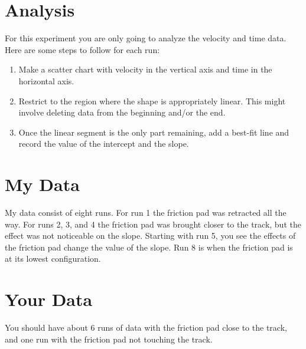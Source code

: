 \section{Analysis}
%
For this experiment you are only going to analyze the velocity and time data. Here are some steps to follow for each run:
\begin{enumerate}
    \item Make a scatter chart with velocity in the vertical axis and time in the horizontal axis.
    \item Restrict to the region where the shape is appropriately linear. This might involve deleting data from the beginning and/or the end.
    \item Once the linear segment is the only part remaining, add a best-fit line and record the value of the intercept and the slope.
\end{enumerate}
%
\section{My Data}
%
My data consist of eight runs. For run 1 the friction pad was retracted all the way. For runs 2, 3, and 4 the friction pad was brought closer to the track, but the effect was not noticeable on the slope. Starting with run 5, you see the effects of the friction pad change the value of the slope. Run 8 is when the friction pad is at its lowest configuration.
%
\section{Your Data}
%
You should have about 6 runs of data with the friction pad close to the track, and one run with the friction pad not touching the track.
%
\newpage
